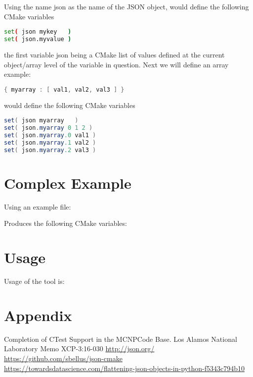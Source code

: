 \documentclass[12pt]{article}
\begin{document}
Using the name json as the name of the JSON object, would define the following CMake variables
\begin{lstlisting}[language=bash,basicstyle=\tiny,frame=single,columns=fullflexible]
set( json mykey   ) 
set( json.myvalue )
\end{lstlisting}
the first variable json being a CMake list of values defined at the current object/array level of the variable in question.
Next we will define an array example:
\begin{lstlisting}[language=java,basicstyle=\tiny,frame=single,columns=fullflexible]
{ myarray : [ val1, val2, val3 ] }
\end{lstlisting}
would define the following CMake variables
\begin{lstlisting}[language=java,basicstyle=\tiny,frame=single,columns=fullflexible]
set( json myarray   ) 
set( json.myarray 0 1 2 )
set( json.myarray.0 val1 ) 
set( json.myarray.1 val2 ) 
set( json.myarray.2 val3 ) 
\end{lstlisting}

\section{Complex Example}
Using an example file:

Produces the following CMake variables:

\newpage
\section{Usage}
Usage of the tool is:

\newpage
\appendix
\newpage
\section{Appendix}


\begin{thebibliography}{9}
		 Completion of CTest Support in the MCNP\textregistered Code Base. Los Alamos National Laboratory Memo XCP-3:16-030
	 \url{http://json.org/}
 \url{https://github.com/sbellus/json-cmake}
	 \url{https://towardsdatascience.com/flattening-json-objects-in-python-f5343c794b10}
\end{thebibliography}
\end{document}
